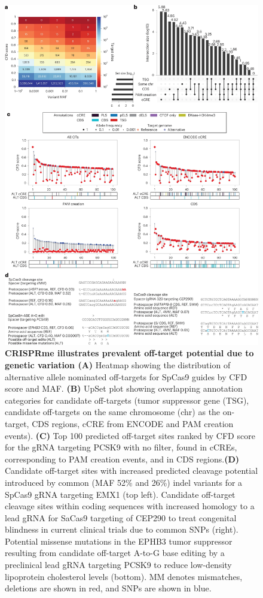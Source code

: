 \documentclass[a4paper, titlepage, openright]{book}
\begin{document}
\begin{figure}
	\centering
	\includegraphics[width=\textwidth]{figures/crisprme8.png}
	\caption[CRISPRme illustrates prevalent off-target potential due to genetic variation]{\textbf{CRISPRme illustrates prevalent off-target potential due to genetic variation (A)} Heatmap showing the distribution of alternative allele nominated off-targets for SpCas9 guides by CFD score and MAF. \textbf{(B)} UpSet plot showing overlapping annotation categories for candidate off-targets (tumor suppressor gene (TSG), candidate off-targets on the same chromosome (chr) as the on-target, CDS regions, cCRE from ENCODE and PAM creation events).  \textbf{(C)} Top 100 predicted off-target sites ranked by CFD score for the gRNA targeting PCSK9 with no filter, found in cCREs, corresponding to PAM creation events, and in CDS regions.\textbf{(D)} Candidate off-target sites with increased predicted cleavage potential introduced by common (MAF 52\% and 26\%) indel variants for a SpCas9 gRNA targeting EMX1 (top left). Candidate off-target cleavage sites within coding sequences with increased homology to a lead gRNA for SaCas9 targeting of CEP290 to treat congenital blindness in current clinical trials due to common SNPs (right). Potential missense mutations in the EPHB3 tumor suppressor resulting from candidate off-target A-to-G base editing by a preclinical lead gRNA targeting PCSK9 to reduce low-density lipoprotein cholesterol levels (bottom). MM denotes mismatches, deletions are shown in red, and SNPs are shown in blue.}
	\label{fig:crisprme8}
\end{figure}
\end{document}
